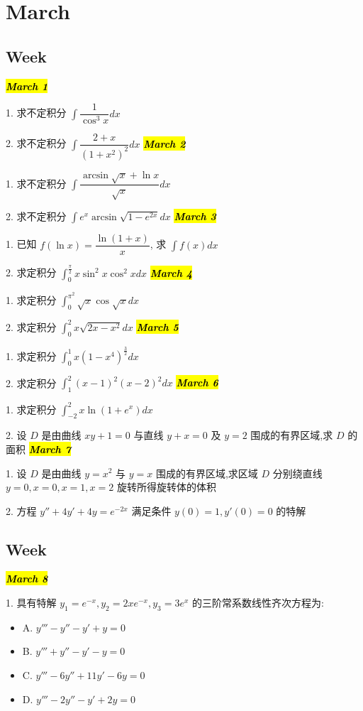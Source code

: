 \chapter{March}
\section{Week }
\hl{\textbf{\textit{March 1}}}

1. 求不定积分 $\int\dfrac{1}{\cos^{3} x}dx$

2. 求不定积分 $\int\dfrac{2+x}{(1+x^{2})^{2}}dx$
\hl{\textbf{\textit{March 2}}}

1. 求不定积分 $\int\dfrac{\arcsin\sqrt{x}+\ln x}{\sqrt{x}}dx$

2. 求不定积分 $\int e^{x}\arcsin\sqrt{1-e^{2x}}dx$
\hl{\textbf{\textit{March 3}}}

1. 已知 $f(\ln x)=\dfrac{\ln(1+x)}{x}$, 求 $\int f(x)dx$

2. 求定积分 $\int_{0}^{\frac{\pi}{2}}x\sin^{2}x\cos^{2}xdx$
\hl{\textbf{\textit{March 4}}}

1. 求定积分 $\int_{0}^{\pi^{2}}\sqrt{x}\cos\sqrt{x}dx$

2. 求定积分 $\int_{0}^{2}x\sqrt{2x-x^{2}}dx$
\hl{\textbf{\textit{March 5}}}

1. 求定积分 $\int_{0}^{1}x(1-x^{4})^{\frac{3}{2}}dx$

2. 求定积分 $\int_{1}^{2}(x-1)^{2}(x-2)^{2}dx$
\hl{\textbf{\textit{March 6}}}

1. 求定积分 $\int_{-2}^{2}x\ln(1+e^{x})dx$

2. 设 $D$ 是由曲线 $xy+1=0$ 与直线 $y+x=0$ 及 $y=2$ 围成的有界区域,求 $D$ 的面积
\hl{\textbf{\textit{March 7}}}

1. 设 $D$ 是由曲线 $y=x^{2}$ 与 $y=x$ 围成的有界区域,求区域 $D$ 分别绕直线 $y=0,x=0,x=1,x=2$ 旋转所得旋转体的体积

2. 方程 $y''+4y'+4y=e^{-2x}$ 满足条件 $y(0)=1,y'(0)=0$ 的特解
\section{Week }
\hl{\textbf{\textit{March 8}}}

1. 具有特解 $y_{1}=e^{-x},y_{2}=2xe^{-x},y_{3}=3e^{x}$ 的三阶常系数线性齐次方程为:
\begin{itemize}
	\item A. $y'''-y''-y'+y=0$
	\item B. $y'''+y''-y'-y=0$
	\item C. $y'''-6y''+11y'-6y=0$
	\item D. $y'''-2y''-y'+2y=0$
\end{itemize}

